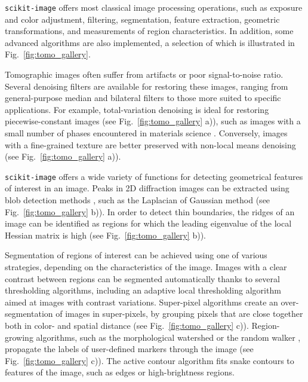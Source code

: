 \documentclass[twocolumn]{bmcart}%
\begin{document}
\texttt{scikit-image} offers most classical image processing operations,
such as exposure and color adjustment, filtering,
segmentation, feature extraction, geometric transformations, and
measurements of region characteristics. In addition, some advanced
algorithms are also implemented, a selection of which is illustrated in
Fig.~\ref{fig:tomo_gallery}.  

Tomographic images often suffer from artifacts or poor signal-to-noise
ratio. Several denoising filters are available for restoring these
images, ranging from general-purpose median and bilateral
filters to those more suited to specific applications. For example, total-variation denoising \citep{Chambolle2004,
Getreuer2012} is ideal for restoring piecewise-constant images (see
Fig.~\ref{fig:tomo_gallery} a)), such as images with a small number of
phases encountered in materials science \citep{Bouttes2015}. Conversely,
images with a fine-grained texture are better preserved with non-local
means denoising \citep{Buades2005} (see Fig.~\ref{fig:tomo_gallery} a)).

\texttt{scikit-image} offers a wide variety of functions for detecting
geometrical features of interest in an image. Peaks in 2D
diffraction images can be extracted using blob detection methods
\citep{Ashiotis2015}, such as the Laplacian of Gaussian method (see
Fig.~\ref{fig:tomo_gallery} b)). In order to detect thin boundaries, the
ridges of an image can be identified as regions for which the leading eigenvalue
of the local Hessian matrix is high (see Fig.~\ref{fig:tomo_gallery} b)).

Segmentation of regions of interest can be achieved using one of various
strategies, depending on the characteristics of the image. Images with a
clear contrast between regions can be segmented automatically thanks to
several thresholding algorithms, including an adaptive local thresholding
algorithm aimed at images with contrast variations. Super-pixel
algorithms \citep{Felzenszwalb2004, Achanta2012} create an
over-segmentation of images in super-pixels, by grouping pixels that are
close together both in color- and spatial distance (see
Fig.~\ref{fig:tomo_gallery} c)). Region-growing algorithms, such as the
morphological watershed or the random walker \citep{Grady2006}, propagate
the labels of user-defined markers through the image (see
Fig.~\ref{fig:tomo_gallery} c)). The active contour algorithm
\citep{Kass1988} fits snake contours to features of the image, such as
edges or high-brightness regions.
\end{document}
